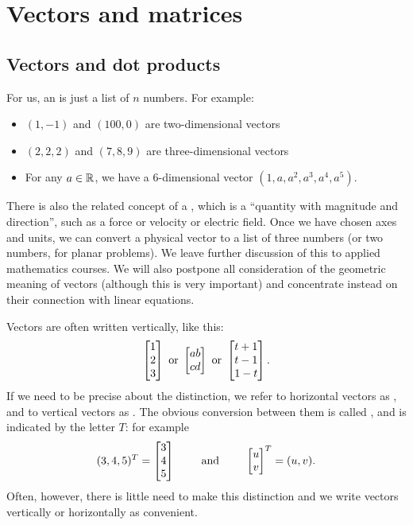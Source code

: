 \documentclass[a4paper]{book}
\theoremstyle{definition}
\begin{document}


\chapter{Vectors and matrices}
\label{chap-mat}

\section{Vectors and dot products}
\label{sec-vectors}

For us, an  is just a list of $n$
numbers.  For example:
\begin{itemize}
 \item $(1,-1)$ and $(100,0)$ are two-dimensional vectors
 \item $(2,2,2)$ and $(7,8,9)$ are three-dimensional vectors
 \item For any $a\in{\mathbb{R}}$, we have a $6$-dimensional vector
  $(1,a,a^2,a^3,a^4,a^5)$. 
\end{itemize}
There is also the related concept of a , which
is a ``quantity with magnitude and direction'', such as a force or
velocity or electric field.  Once we have chosen axes and units, we
can convert a physical vector to a list of three numbers (or two
numbers, for planar problems).  We leave further discussion of this to
applied mathematics courses.  We will also postpone all consideration
of the geometric meaning of vectors (although this is very important)
and concentrate instead on their connection with linear equations.

Vectors are often written vertically, like this:
\[ \begin{bmatrix} 1 \\ 2 \\ 3 \end{bmatrix} \text{ or }
   \begin{bmatrix} ab \\ cd \end{bmatrix} \text{ or }
   \begin{bmatrix} t+1 \\ t-1 \\ 1-t \end{bmatrix}.
\]
If we need to be precise about the distinction, we refer to horizontal
vectors as , and to vertical vectors as .  The obvious conversion between them is called
, and is indicated by the letter $T$: for example
\[ (3,4,5)^T = \begin{bmatrix} 3 \\ 4 \\ 5 \end{bmatrix}
    \qquad \text{ and } \qquad
   \begin{bmatrix} u \\ v \end{bmatrix}^T = (u,v).
\]
Often, however, there is little need to make this distinction and we
write vectors vertically or horizontally as convenient.
\end{document}

